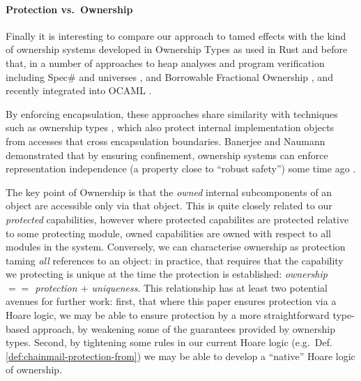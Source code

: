 \paragraph{Protection vs.\ Ownership}

Finally it is interesting to compare our approach to tamed effects
with the kind of ownership systems developed in Ownership Types
\cite{simpleOwnership,existOwn} as used in Rust
\cite{RustPL2,RustBelt18} and before that, in a number of approaches
to heap analyses \cite{PotterNC98,HillNP02,MitECOOP06} and
program verification
\cite{BoyLisShrPOPL03,hypervisor} including Spec$\#$
\cite{BarLeiSch05,BarDelFahLeiSch04} and universes
\cite{DieDroMue07,DietlMueller05,LuPotPOPL06},
and Borrowable Fractional Ownership \cite{borrow-fract-vmcai2024},
and recently integrated into OCAML \cite{ocaml-ownership-icfp2024,funk-ownership-oopsla2024}.

By enforcing encapsulation,  %
these approaches share similarity with techniques such as
ownership types \cite{ownalias,NobPotVitECOOP98}, which also
protect internal implementation objects from accesses that cross
encapsulation boundaries.  Banerjee and Naumann demonstrated that by
ensuring confinement, ownership
systems can enforce representation independence (a property close to
``robust safety'') some time ago \cite{Banerjee:2005}.


The key point of Ownership is that the \textit{owned} internal
subcomponents of an object are accessible only via that object.
This
is quite closely related to our \textit{protected} capabilities,
however where protected capabilites are protected relative to some
protecting module, owned capabilities are owned with respect to all
modules in the system.  Conversely, we can characterise ownership as
protection taming \textit{all} references to an object: in practice,
that requires that the capability we protecting is unique at the time
the protection is established: \textit{ownership $==$ protection $+$
  uniqueness}.  This relationship has at least two potential avenues
for further work: first, that where this paper ensures protection via
a Hoare logic, we may be able to ensure protection by a
more straightforward type-based approach, by weakening some of the
guarantees provided by ownership types.  Second,  by tightening some
rules in our current Hoare logic (e.g.\ Def. \ref{def:chainmail-protection-from})
we may be able to develop a ``native''  Hoare logic of ownership.


